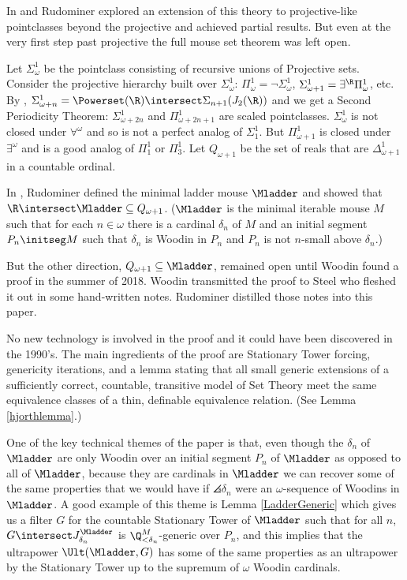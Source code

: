 \documentclass[oneside,12pt]{amsart}
\begin{document}
In \cite{My_Thesis} and \cite{Mouse_Sets} Rudominer explored an extension of this theory
to projective-like pointclasses beyond the projective and achieved partial results.
But even at the very first step past projective the full mouse set theorem was left open.

Let $\Sigma^1_{\omega}$
be the pointclass consisting of recursive unions of Projective sets. Consider
the projective hierarchy built over $\Sigma^1_{\omega}$:
$\Pi^1_{\omega} = \neg \Sigma^1_{\omega}$,
$\Sigma^1_{\omega+1} = \exists^{\R} \Pi^1_{\omega}$, etc.
By \cite{Scales_In_LofR}, $\Sigma^1_{\omega+n} = \Powerset(\R)\intersect \Sigma_{n+1}(J_2(\R))$
and we get a Second Periodicity Theorem: $\Sigma^1_{\omega+2n}$ and $\Pi^1_{\omega+2n+1}$ are scaled pointclasses.
$\Sigma^1_{\omega}$ is not closed under $\forall^{\omega}$ and so is not a perfect analog of $\Sigma^1_1$.
But $\Pi^1_{\omega+1}$ is closed under $\exists^{\omega}$ and is a good analog of $\Pi^1_1$ or $\Pi^1_3$.
Let $Q_{\omega+1}$ be the set of reals that are $\Delta^1_{\omega+1}$ in a countable ordinal.

In \cite{My_Thesis}, Rudominer defined the minimal ladder mouse $\Mladder$ and showed that
$\R\intersect\Mladder\subseteq Q_{\omega+1}$. ($\Mladder$ is the minimal iterable mouse $M$ such
that for each $n\in\omega$ there is a cardinal $\delta_n$ of $M$ and an initial segment $P_n \initseg M$
such that $\delta_n$ is Woodin in $P_n$ and $P_n$ is not $n$-small above $\delta_n$.)

But the other direction, $Q_{\omega+1} \subseteq \Mladder$, remained open until
Woodin found a proof in the summer of 2018. Woodin transmitted the proof to Steel who fleshed it out
in some hand-written notes. Rudominer distilled those notes into this paper.

No new technology is involved in the proof and it could have been discovered in the 1990's. The main ingredients
of the proof are Stationary Tower forcing, genericity iterations, and a lemma stating that
all small generic extensions of a sufficiently correct, countable, transitive model of Set Theory
meet the same equivalence classes of a thin, definable equivalence
relation. (See Lemma \ref{hjorthlemma}.)

One of the key technical themes of the paper is that, even though
the $\delta_n$ of $\Mladder$ are only Woodin over an initial segment $P_n$
of $\Mladder$ as opposed to all of $\Mladder$, because they are
cardinals in $\Mladder$ we can recover some of the same properties
that we would have if $\angles{\delta_n}$ were an $\omega$-sequence
of Woodins in $\Mladder$. A good example of this theme is Lemma
\ref{LadderGeneric} which gives us a filter $G$ for the countable
Stationary Tower of $\Mladder$ such that for all $n$,
$G\intersect J^{\Mladder}_{\delta_n}$ is $\Q_{<\delta_n}^M$-generic over $P_n$, and this implies
that the ultrapower $\Ult(\Mladder, G)$ has some of the same properties as an
ultrapower by the Stationary Tower up to the supremum
of $\omega$ Woodin cardinals.
\end{document}
